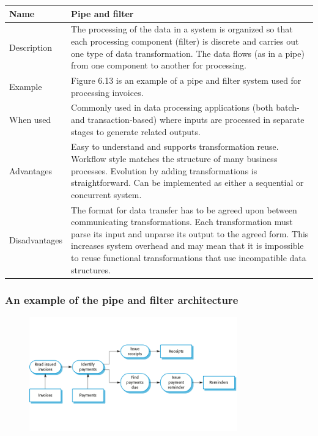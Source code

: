 \begin{table}[h!]
\centering
\begin{tabular}{ |p{3cm}|p{8cm}|  }
\hline
Name & Pipe and filter\\
\hline
\hline
Description & The processing of the data in a system is organized so that each processing component (filter) is discrete and carries out one type of data transformation. The data flows (as in a pipe) from one component to another for processing.\\
\hline
Example & Figure 6.13 is an example of a pipe and filter system used for processing invoices.\\
\hline
When used & Commonly used in data processing applications (both batch- and transaction-based) where inputs are processed in separate stages to generate related outputs.\\
\hline
Advantages & Easy to understand and supports transformation reuse. Workflow style matches the structure of many business processes. Evolution by adding transformations is straightforward. Can be implemented as either a sequential or concurrent system.\\
\hline
Disadvantages & The format for data transfer has to be agreed upon between communicating transformations. Each transformation must parse its input and unparse its output to the agreed form. This increases system overhead and may mean that it is impossible to reuse functional transformations that use incompatible data structures.\\
\hline
\end{tabular}

\label{table:T2_3}
\end{table}

\newpage
\subsubsection{An example of the pipe and filter architecture}
\begin{figure}[h!]
    \centering
    \includegraphics[width = 0.8\textwidth]{./figures/L3_8.png}
    \caption{}
    \label{fig:L3_8}
\end{figure}

